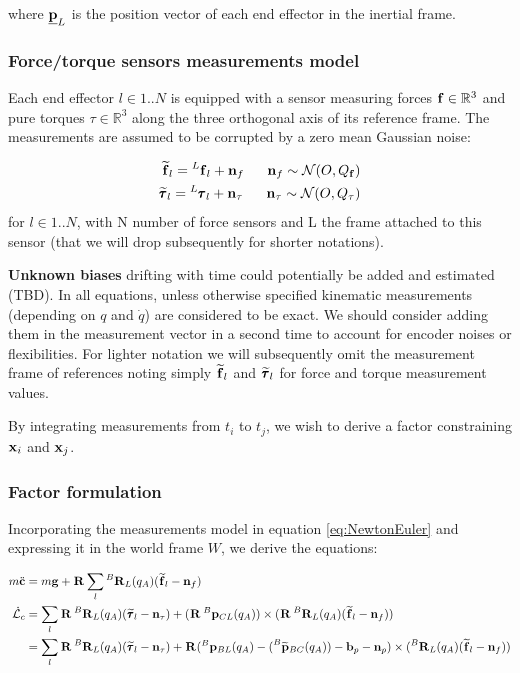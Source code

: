 \documentclass[11pt]{article}
\newcommand{\Rot}[2]{\prescript{#1}{}{\bfR}_{#2}}
\newcommand{\noise}{\bfn}
\newcommand{\bias}{\bfb}
\newcommand{\posiv}[1]{\underline{\bfp}_{#1}}
\newcommand{\posi}[2]{\prescript{#1}{}{\bfp}_{#2}}
\newcommand{\posim}[2]{\prescript{#1}{}{\widetilde{\bfp}}_{#2}}
\newcommand{\force}[2]{\prescript{#1}{}{\bff}_{#2}}
\newcommand{\forcem}[2]{\prescript{#1}{}{\widetilde{\bff}}_{#2}}
\newcommand{\torque}[2]{\prescript{#1}{}{\pmb{\tau}}_{#2}}
\newcommand{\torquem}[2]{\prescript{#1}{}{\widetilde{\pmb{\tau}}}_{#2}}
\newcommand{\AM}{\mathcal{L}}
\newcommand{\COM}{\bfc}
\newcommand{\Reals}{\mathbb{R}}
\begin{document}
where \(\posiv{L} \) is the position vector of each end effector in the inertial frame.

\subsubsection{Force/torque sensors measurements model}

Each end effector $l \in 1..N$ is equipped with a sensor measuring forces $\bff \in \Reals^3$ and pure torques $\tau \in \Reals^3$ along the three orthogonal axis of its reference frame. The measurements are assumed to be corrupted by a zero mean Gaussian noise:

\begin{equation}
\begin{split}
    \forcem{}{l} = \force{L}{l} + \noise_f~~~~~\noise_f \sim \mathcal{N}(O,Q_{\bff})
    \\
    \torquem{}{l} = \torque{L}{l} + \noise_{\tau} ~~~~~ \noise_{\tau} \sim \mathcal{N}(O,Q_{\tau})
\end{split}
\end{equation} 
for $l \in 1..N$, with N number of force sensors and L the frame attached to this sensor (that we will drop subsequently for shorter notations).

\textbf{Unknown biases} drifting with time could potentially be added and estimated (TBD). 
In all equations, unless otherwise specified kinematic measurements (depending on $q$ and $\dot{q}$) are considered to be exact. We should consider adding them in the measurement vector in a second time to account for encoder noises or flexibilities.
For lighter notation we will subsequently omit the measurement frame of references noting simply \(\forcem{}{l}\) and \(\torquem{}{l}\) for force and torque measurement values.

By integrating measurements from $t_i$ to $t_j$, we wish to derive a factor constraining ${\bf x}_i$ and ${\bf x}_j$.

\subsubsection{Factor formulation}
Incorporating the measurements model in equation \ref{eq:NewtonEuler} and expressing it in the world frame \(W\), we derive the equations:

\begin{equation}
\begin{split}
m\ddot{\COM}&= 
m\bfg + \Rot{}{} \sum_l \Rot{B}{L}(q_A) (\forcem{}{l} - \noise_f) 
\\
\dot{\AM}_c&= 
\sum_l \Rot{}{}\Rot{B}{L}(q_A)(\torquem{}{l} - \noise_{\tau}) + (\Rot{}{} \posi{B}{CL}(q_A)) \times (\Rot{}{}\Rot{B}{L}(q_A)(\forcem{}{l} - \noise_f))
\\
&= \sum_l \Rot{}{}\Rot{B}{L}(q_A)(\torquem{}{l} - \noise_{\tau}) + \Rot{}{}( \posi{B}{BL}(q_A) - (\posim{B}{BC}(q_A)) -  \bias_{p} - \noise_p) \times (\Rot{B}{L}(q_A)(\forcem{}{l} - \noise_f))
\end{split}
\end{equation}
\end{document}
